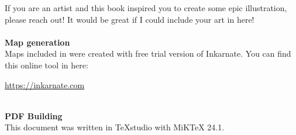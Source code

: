If you are an artist and this book inspired you to create some epic illustration, please reach out! It would be great if I could include your art in here! \\ \\


\noindent\textbf{\Large Map generation} \\ 

Maps included in  were created with free trial version of Inkarnate. You can find this online tool in here: 

\url{https://inkarnate.com} \\ \\



\noindent\textbf{\Large PDF Building} \\ 

This document was written in TeXstudio with MiKTeX 24.1.

